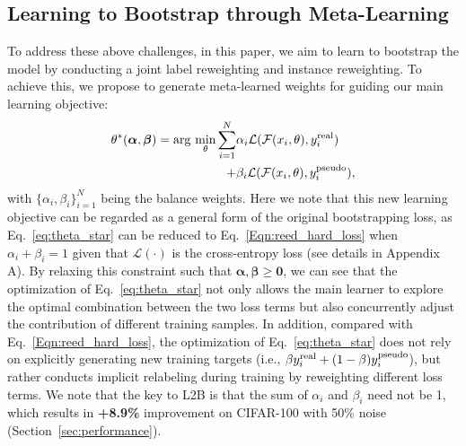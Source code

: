\documentclass{article}
\newcommand{\argmin}{\arg\,\min}
\begin{document}
\subsection{Learning to Bootstrap through Meta-Learning}
To address these above challenges, in this paper, we aim to learn to bootstrap the model by conducting a joint label reweighting and instance reweighting.
To achieve this, we propose to generate meta-learned weights for guiding our main learning objective: 
\begin{equation}
\label{eq:theta_star}
\begin{aligned}
\theta^*(\boldsymbol{\alpha}, \boldsymbol{\beta})  = \argmin_\theta \sum_{i=1}^N &\alpha_i \mathcal{L}(\mathcal{F} (x_i,\theta), y_i^\textup{real}) \\ + &\beta_i \mathcal{L}(\mathcal{F} (x_i,\theta), y_i^\textup{pseudo}),
\end{aligned}
\end{equation}
with $\{\alpha_i, \beta_i\}_{i=1}^N$ being the balance weights. 
Here we note that this new learning objective can be regarded as a general form of the original bootstrapping loss, as Eq.~\eqref{eq:theta_star} can be reduced to Eq.~\eqref{Eqn:reed_hard_loss} when $\alpha_i + \beta_i = 1$ given that $\mathcal{L}(\cdot)$ is the cross-entropy loss (see details in Appendix A).
By relaxing this constraint such that $\boldsymbol{\alpha}, \boldsymbol{\beta} \ge \boldsymbol{0}$, we can see that the optimization of Eq.~\eqref{eq:theta_star} not only allows the main learner to explore the optimal combination between the two loss terms but also concurrently adjust the contribution of different training samples.
In addition, compared with Eq.~\eqref{Eqn:reed_hard_loss}, the optimization of Eq.~\eqref{eq:theta_star} does not rely on explicitly generating new training targets (i.e., $\beta y_i^\textup{real} + (1 - \beta) y_i^\textup{pseudo}$), but rather conducts implicit relabeling during training by reweighting different loss terms.
We note that the key to L2B is that the sum of $\alpha_i$ and $\beta_i$ need not be 1, which results in \textbf{+8.9\%} improvement on CIFAR-100 with 50\% noise (Section~\ref{sec:performance}).
\end{document}
